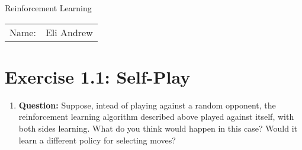 \documentclass[12pt]{article}
\begin{document}
\begin{center}
{\Large Reinforcement Learning}

\begin{tabular}{rl}
Name: & Eli Andrew
\end{tabular}
\end{center}

\section*{Exercise 1.1: Self-Play}

\begin{enumerate}[label=(\alph*)]
  \item \textbf{Question:} Suppose, intead of playing against a random opponent, the reinforcement learning algorithm described above played against itself, with both sides learning. What do you think would happen in this case? Would it learn a different policy for selecting moves?
\end{enumerate}
\end{document}
